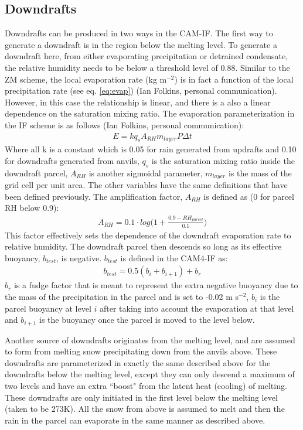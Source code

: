 \documentclass[letterpaper,12pt,titlepage,oneside,final]{book}
\begin{document}
\subsection{Downdrafts}\label{ifdown}
Downdrafts can be produced in two ways in the CAM-IF. The first way to generate a downdraft is in the region below the melting level. To generate a downdraft here, from either evaporating precipitation or detrained condensate, the relative humidity needs to be below a threshold level of 0.88. Similar to the ZM scheme, the local evaporation rate (kg m$^{-2}$) is in fact a function of the local precipitation rate (see eq. \ref{eq:evap}) (Ian Folkins, personal communication). However, in this case the relationship is linear, and there is a also a linear dependence on the saturation mixing ratio. The evaporation parameterization in the IF scheme is as follows (Ian Folkins, personal communication):
\begin{align}\label{eq:ifevap}
E=kq_{s}A_{RH}m_{layer}P\Delta{t}
\end{align}
Where all k is a constant which is 0.05 for rain generated from updrafts and 0.10 for downdrafts generated from anvils, $q_{s}$ is the saturation mixing ratio inside the downdraft parcel, $A_{RH}$ is another sigmoidal parameter, $m_{layer}$ is the mass of the grid cell per unit area. The other variables have the same definitions that have been defined previously. The amplification factor, $A_{RH}$ is defined as (0 for parcel RH below 0.9):
\begin{align}
A_{RH}=0.1\cdot{log}\bigg(1+\frac{0.9-RH_{parcel}}{0.1}\bigg)
\end{align} 
This factor effectively sets the dependence of the downdraft evaporation rate to relative humidity. The downdraft parcel then descends so long as its effective buoyancy, $b_{test}$, is negative. $b_{test}$ is defined in the CAM4-IF as:
\begin{align}
b_{test}=0.5(b_{i}+b_{i+1})+b_{r}
\end{align}
$b_{r}$ is a fudge factor that is meant to represent the extra negative buoyancy due to the mass of the precipitation in the parcel and is set to -0.02 m s$^{-2}$, $b_{i}$ is the parcel buoyancy at level $i$ after taking into account the evaporation at that level and $b_{i+1}$ is the buoyancy once the parcel is moved to the level below. 

Another source of downdrafts originates from the melting level, and are assumed to form from melting snow precipitating down from the anvils above. These downdrafts are parameterized in exactly the same described above for the downdrafts below the melting level, except they can only descend a maximum of two levels and have an extra ``boost" from the latent heat (cooling) of melting. These downdrafts are only initiated in the first level below the melting level (taken to be 273K). All the snow from above is assumed to melt and then the rain in the parcel can evaporate in the same manner as described above.
\end{document}

